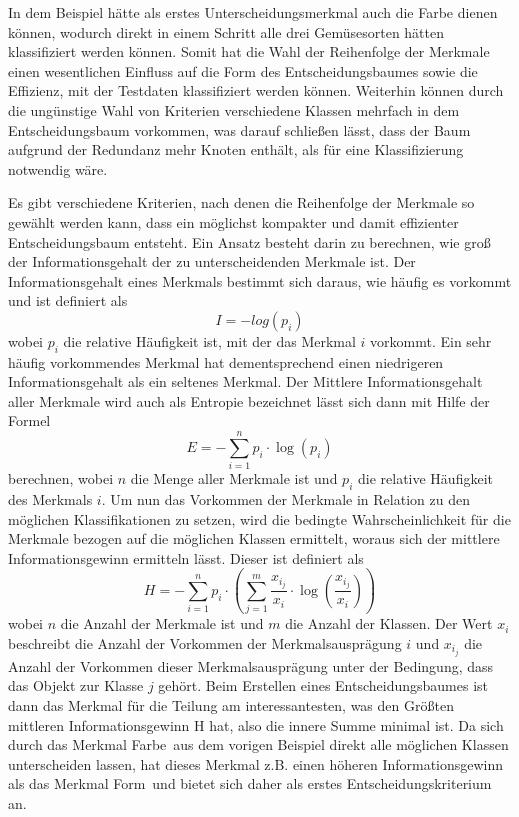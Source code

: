 In dem Beispiel hätte als erstes Unterscheidungsmerkmal auch die Farbe dienen können, wodurch direkt in einem Schritt alle drei Gemüsesorten hätten klassifiziert werden können. Somit hat die Wahl der Reihenfolge der Merkmale einen wesentlichen Einfluss auf die Form des Entscheidungsbaumes sowie die Effizienz, mit der Testdaten klassifiziert werden können. Weiterhin können durch die ungünstige Wahl von Kriterien verschiedene Klassen mehrfach in dem Entscheidungsbaum vorkommen, was darauf schließen lässt, dass der Baum aufgrund der Redundanz mehr Knoten enthält, als für eine Klassifizierung notwendig wäre.

Es gibt verschiedene Kriterien, nach denen die Reihenfolge der Merkmale so gewählt werden kann, dass ein möglichst kompakter und damit effizienter Entscheidungsbaum entsteht. Ein Ansatz besteht darin zu berechnen, wie groß der Informationsgehalt der zu unterscheidenden Merkmale ist. Der Informationsgehalt eines Merkmals bestimmt sich daraus, wie häufig es vorkommt und ist definiert als 
\[I = -log(p_i)\] wobei $p_i$ die relative Häufigkeit ist, mit der das Merkmal $i$ vorkommt. Ein sehr häufig vorkommendes Merkmal hat dementsprechend einen niedrigeren Informationsgehalt als ein seltenes Merkmal. Der Mittlere Informationsgehalt aller Merkmale wird auch als Entropie bezeichnet lässt sich dann mit Hilfe der Formel 
\[E = - \sum \limits_{i=1}^n p_i \cdot \log (p_i)\] berechnen, wobei $n$ die Menge aller Merkmale ist und $p_i$ die relative Häufigkeit des Merkmals $i$.
Um nun das Vorkommen der Merkmale in Relation zu den möglichen Klassifikationen zu setzen, wird die bedingte Wahrscheinlichkeit für die Merkmale bezogen auf die möglichen Klassen ermittelt, woraus sich der mittlere Informationsgewinn ermitteln lässt. Dieser ist definiert als 
\[H = - \sum \limits_{i=1}^n p_i \cdot (\sum \limits_{j=1}^m \frac{x_i_j}{x_i} \cdot \log (\frac{x_i_j}{x_i}))\] wobei $n$ die Anzahl der Merkmale ist und $m$ die Anzahl der Klassen. Der Wert $x_i$ beschreibt die Anzahl der Vorkommen der Merkmalsausprägung $i$ und $x_i_j$ die Anzahl der Vorkommen dieser Merkmalsausprägung unter der Bedingung, dass das Objekt zur Klasse $j$ gehört.
Beim Erstellen eines Entscheidungsbaumes ist dann das Merkmal für die Teilung am interessantesten, was den Größten mittleren Informationsgewinn H hat, also die innere Summe minimal ist.
Da sich durch das Merkmal \glqq Farbe\grqq\ aus dem vorigen Beispiel direkt alle möglichen Klassen unterscheiden lassen, hat dieses Merkmal z.B. einen höheren Informationsgewinn als das Merkmal \glqq Form\grqq\ und bietet sich daher als erstes Entscheidungskriterium an.

